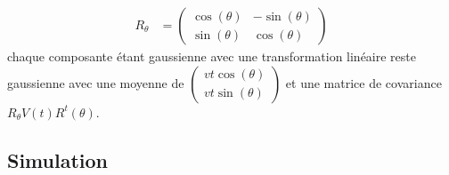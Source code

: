 \documentclass[a4paper, 12pt,twoside]{article}
\numberwithin{equation}{subsection}
\begin{document}
	\begin{align}
	R_{\theta} &= \left( \begin{array}{cc}
		\cos(\theta) & -\sin(\theta) \\
		\sin(\theta) & \cos(\theta)
	\end{array} \right)
	\end{align}
	chaque composante étant gaussienne avec une transformation linéaire reste gaussienne avec une moyenne de $\left( \begin{array}{c}
		vt \cos(\theta) \\ vt \sin(\theta)
	\end{array} \right)$ 
	et une matrice de covariance $R_\theta V(t) R^t(\theta)$. 
	
	
	\subsection{Simulation} %
	\label{sub:simulation}
	
\end{document}
